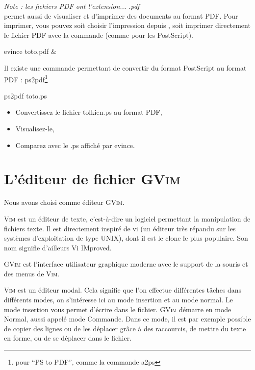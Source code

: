 \documentclass[a4paper,10pt]{article}
\begin{document}
\emph{Note : les fichiers PDF ont l'extension... .pdf}\\

 permet aussi de visualiser et d'imprimer des documents au format PDF.
Pour imprimer, vous pouvez soit choisir l'impression depuis , soit
imprimer directement le fichier PDF avec la commande  (comme pour
les PostScript).

\begin{commandes}
evince toto.pdf \&
\end{commandes}

Il existe une commande permettant de convertir du format PostScript
au format PDF : ps2pdf\footnote{pour ``PS to PDF'', comme la commande a2ps}

\begin{commandes}
ps2pdf toto.ps
\end{commandes}

\begin{maw}
\begin{itemize}
  \item Convertissez le fichier tolkien.ps au format PDF,
  \item Visualisez-le,
  \item Comparez avec le .ps affiché par \textrm{evince}.
\end{itemize}
\end{maw}

\newpage

\section{L'éditeur de fichier \textsc{GVim}}

Nous avons choisi comme \'editeur \textsc{GVim}.

\textsc{Vim} est un \'editeur de texte, c'est-\`a-dire un logiciel
permettant la manipulation de fichiers texte. Il est directement inspir\'e de
vi (un \'editeur tr\`es r\'epandu sur les syst\`emes d'exploitation de type
UNIX), dont il est le clone le plus populaire. Son nom signifie d'ailleurs Vi
IMproved.

\textsc{GVim} est l'interface utilisateur graphique moderne avec le
support de la souris et des menus de \textsc{Vim}.

\textsc{Vim} est un \'editeur modal. Cela signifie que l'on effectue
diff\'erentes t\^aches dans diff\'erents modes, on s'int\'eresse ici au mode
insertion et au mode normal. Le mode insertion vous permet d'\'ecrire dans le
fichier.  
\textsc{GVim} d\'emarre en mode Normal, aussi appel\'e mode Commande. Dans ce
mode, il est par exemple possible de copier des lignes ou de les d\'eplacer
gr\^ace \`a des raccourcis, de mettre du texte en forme, ou de se d\'eplacer
dans le fichier.
\end{document}

